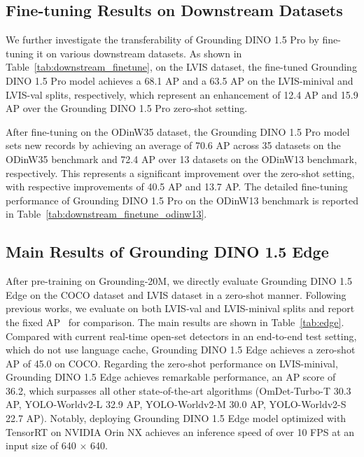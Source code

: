 \subsection{Fine-tuning Results on Downstream Datasets}

We further investigate the transferability of Grounding DINO 1.5 Pro by fine-tuning it on various downstream datasets. As shown in Table~\ref{tab:downstream_finetune}, on the LVIS dataset, the fine-tuned Grounding DINO 1.5 Pro model achieves a 68.1 AP and a 63.5 AP on the LVIS-minival and LVIS-val splits, respectively, which represent an enhancement of 12.4 AP and 15.9 AP over the Grounding DINO 1.5 Pro zero-shot setting.



After fine-tuning on the ODinW35 dataset, the Grounding DINO 1.5 Pro model sets new records by achieving an average of 70.6 AP across 35 datasets on the ODinW35 benchmark and 72.4 AP over 13 datasets on the ODinW13 benchmark, respectively. This represents a significant improvement over the zero-shot setting, with respective improvements of 40.5 AP and 13.7 AP. The detailed fine-tuning performance of Grounding DINO 1.5 Pro on the ODinW13 benchmark is reported in Table~\ref{tab:downstream_finetune_odinw13}. 



\subsection{Main Results of Grounding DINO 1.5 Edge}
After pre-training on Grounding-20M, we directly evaluate Grounding DINO 1.5 Edge on the COCO dataset and LVIS dataset in a zero-shot manner. Following previous works\cite{GroundingDINO,cheng2024yolo,GLIPv2}, we evaluate on both LVIS-val and LVIS-minival splits and report the fixed AP~\cite{FixedAP} for comparison. The main results are shown in Table~\ref{tab:edge}. 
Compared with current real-time open-set detectors in an end-to-end test setting, which do not use language cache, Grounding DINO 1.5 Edge achieves a zero-shot AP of 45.0 on COCO.  Regarding the zero-shot performance on LVIS-minival, Grounding DINO 1.5 Edge achieves remarkable performance, an AP score of 36.2, which surpasses all other state-of-the-art algorithms (OmDet-Turbo-T 30.3 AP, YOLO-Worldv2-L 32.9 AP, YOLO-Worldv2-M 30.0 AP, YOLO-Worldv2-S 22.7 AP).  Notably, deploying Grounding DINO 1.5 Edge model optimized with TensorRT on NVIDIA Orin NX achieves an inference speed of over 10 FPS at an input size of 640 $\times$ 640.

